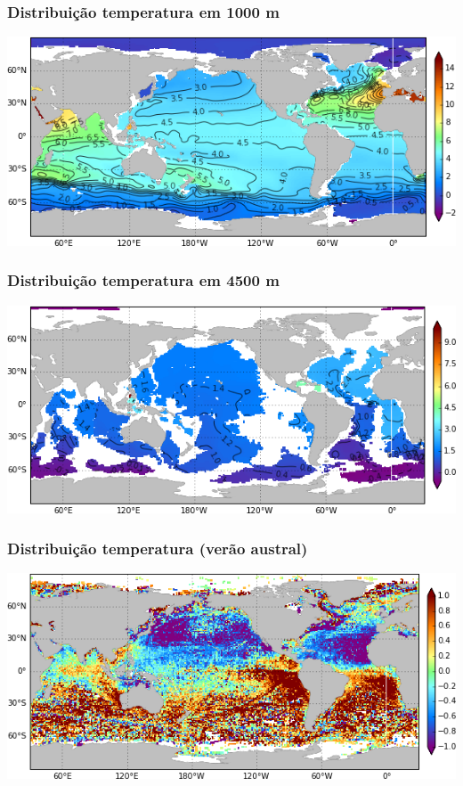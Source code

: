 \begin{frame}
\frametitle{Distribuição temperatura em 1000 m}
  \begin{center}
    \includegraphics[scale=0.6]{./figures/woa09_temperature_1000_annual.png}
  \end{center}
\end{frame}


\begin{frame}
\frametitle{Distribuição temperatura em 4500 m}
  \begin{center}
    \includegraphics[scale=0.6]{./figures/woa09_temperature_4500_annual.png}
  \end{center}
\end{frame}


\begin{frame}
\frametitle{Distribuição temperatura (verão austral)}
  \begin{center}
    \includegraphics[scale=0.6]{./figures/woa09_temperature_summer_anomaly.png}
  \end{center}
\end{frame}


